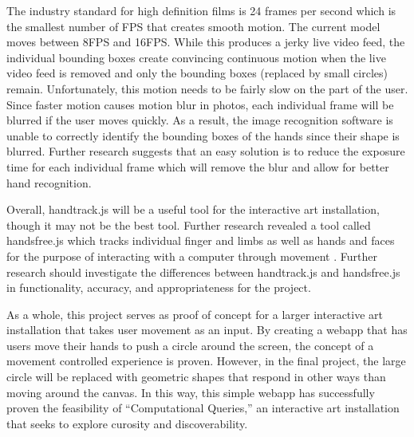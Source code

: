 \documentclass[10pt,twocolumn]{article}
\begin{document}
The industry standard for high definition films is 24 frames per second \cite{noauthor_3_nodate} which is the smallest number of FPS that creates smooth motion.  The current model moves between 8FPS and 16FPS. While this produces a jerky live video feed, the individual bounding boxes create convincing continuous motion when the live video feed is removed and only the bounding boxes (replaced by small circles) remain. Unfortunately, this motion needs to be fairly slow on the part of the user.  Since faster motion causes motion blur in photos, each individual frame will be blurred if the user moves quickly. As a result, the image recognition software is unable to correctly identify the bounding boxes of the hands since their shape is blurred. Further research suggests that an easy solution is to reduce the exposure time for each individual frame which will remove the blur \cite{e_adjusting_2019} and allow for better hand recognition.   

Overall, handtrack.js will be a useful tool for the interactive art installation, though it may not be the best tool.  Further research revealed a tool called handsfree.js which tracks individual finger and limbs as well as hands and faces for the purpose of interacting with a computer through movement \cite{noauthor_handsfreejs_nodate-2}.  Further research should investigate the differences between handtrack.js and handsfree.js in functionality, accuracy, and appropriateness for the project.  

As a whole, this project serves as proof of concept for a larger interactive art installation that takes user movement as an input. By creating a webapp that has users move their hands to push a circle around the screen, the concept of a movement controlled experience is proven.  However, in the final project, the large circle will be replaced with geometric shapes that respond in other ways than moving around the canvas. In this way, this simple webapp has successfully proven the feasibility of ``Computational Queries,'' an interactive art installation that seeks to explore curosity and discoverability. 


\printbibliography 
\end{document}
